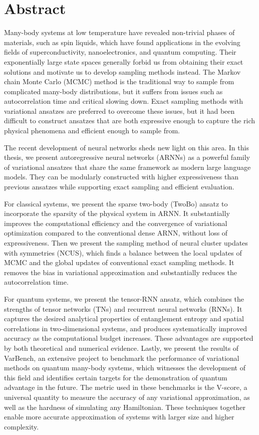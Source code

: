 \cleardoublepage
\chapter*{Abstract}

Many-body systems at low temperature have revealed non-trivial phases of materials, such as spin liquids, which have found applications in the evolving fields of superconductivity, nanoelectronics, and quantum computing.
Their exponentially large state spaces generally forbid us from obtaining their exact solutions and motivate us to develop sampling methods instead.
The Markov chain Monte Carlo (MCMC) method is the traditional way to sample from complicated many-body distributions, but it suffers from issues such as autocorrelation time and critical slowing down.
Exact sampling methods with variational ansatzes are preferred to overcome these issues, but it had been difficult to construct ansatzes that are both expressive enough to capture the rich physical phenomena and efficient enough to sample from.

The recent development of neural networks sheds new light on this area.
In this thesis, we present autoregressive neural networks (ARNNs) as a powerful family of variational ansatzes that share the same framework as modern large language models.
They can be modularly constructed with higher expressiveness than previous ansatzes while supporting exact sampling and efficient evaluation.

For classical systems, we present the sparse two-body (TwoBo) ansatz to incorporate the sparsity of the physical system in ARNN.
It substantially improves the computational efficiency and the convergence of variational optimization compared to the conventional dense ARNN, without loss of expressiveness.
Then we present the sampling method of neural cluster updates with symmetries (NCUS), which finds a balance between the local updates of MCMC and the global updates of conventional exact sampling methods.
It removes the bias in variational approximation and substantially reduces the autocorrelation time.

For quantum systems, we present the tensor-RNN ansatz, which combines the strengths of tensor networks (TNs) and recurrent neural networks (RNNs).
It captures the desired analytical properties of entanglement entropy and spatial correlations in two-dimensional systems, and produces systematically improved accuracy as the computational budget increases.
These advantages are supported by both theoretical and numerical evidence.
Lastly, we present the results of VarBench, an extensive project to benchmark the performance of variational methods on quantum many-body systems, which witnesses the development of this field and identifies certain targets for the demonstration of quantum advantage in the future.
The metric used in these benchmarks is the V-score, a universal quantity to measure the accuracy of any variational approximation, as well as the hardness of simulating any Hamiltonian.
These techniques together enable more accurate approximation of systems with larger size and higher complexity.

